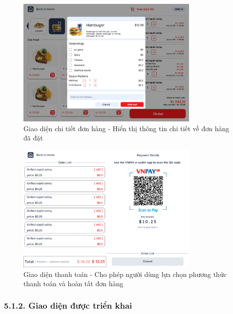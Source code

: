 \documentclass[a4paper]{article}
\begin{document}
    \begin{figure}[H]
        \centering
        \includegraphics[width=0.8\textwidth]{figmaOrderDetail.png}
        \caption{Giao diện chi tiết đơn hàng - Hiển thị thông tin chi tiết về đơn hàng đã đặt}
    \end{figure}
    
    \begin{figure}[H]
        \centering
        \includegraphics[width=0.8\textwidth]{figmaPayment.png}
        \caption{Giao diện thanh toán - Cho phép người dùng lựa chọn phương thức thanh toán và hoàn tất đơn hàng}
    \end{figure}

\subsubsection{5.1.2. Giao diện được triển khai}
\end{document}
